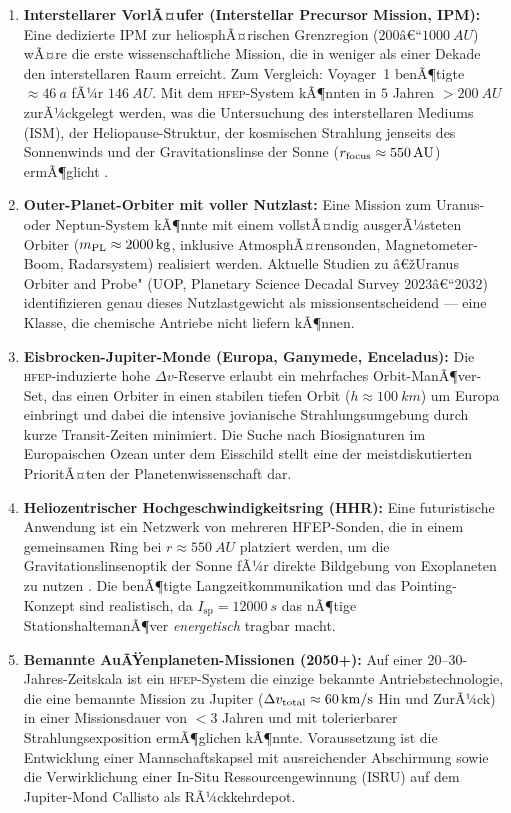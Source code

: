 ﻿\documentclass[a4paper,12pt,twoside]{article}
\theoremstyle{plain}
\theoremstyle{definition}
\theoremstyle{remark}
\newcommand{\Isp}{I_{\mathrm{sp}}}
\newcommand{\Dv}{\Delta v}
\newcommand{\HFEP}{\textsc{hfep}}
\begin{document}
	\begin{enumerate}
		\item \textbf{Interstellarer VorlÃ¤ufer (Interstellar Precursor Mission, IPM):}
		Eine dedizierte IPM zur heliosphÃ¤rischen Grenzregion
		($200\text{â€“}\SI{1000}{AU}$) wÃ¤re die erste wissenschaftliche Mission, die
		in weniger als einer Dekade den interstellaren Raum erreicht. Zum Vergleich:
		Voyager~1 benÃ¶tigte $\approx\SI{46}{a}$ fÃ¼r $\SI{146}{AU}$. Mit dem
		\HFEP-System kÃ¶nnten in $5$ Jahren $>\SI{200}{AU}$ zurÃ¼ckgelegt werden,
		was die Untersuchung des interstellaren Mediums (ISM), der
		Heliopause-Struktur, der kosmischen Strahlung jenseits des Sonnenwinds und
		der Gravitationslinse der Sonne ($r_{\rm focus} \approx \SI{550}{AU}$)
		ermÃ¶glicht \cite{stone2013}.

		\item \textbf{Outer-Planet-Orbiter mit voller Nutzlast:}
		Eine Mission zum Uranus- oder Neptun-System kÃ¶nnte mit einem vollstÃ¤ndig
		ausgerÃ¼steten Orbiter ($m_{\rm PL} \approx \SI{2000}{kg}$, inklusive
		AtmosphÃ¤rensonden, Magnetometer-Boom, Radarsystem) realisiert werden.
		Aktuelle Studien zu â€žUranus Orbiter and Probe" (UOP, Planetary Science
		Decadal Survey 2023â€“2032) identifizieren genau dieses Nutzlastgewicht als
		missionsentscheidend --- eine Klasse, die chemische Antriebe nicht liefern
		kÃ¶nnen.

		\item \textbf{Eisbrocken-Jupiter-Monde (Europa, Ganymede, Enceladus):}
		Die \HFEP-induzierte hohe $\Dv$-Reserve erlaubt ein mehrfaches
		Orbit-ManÃ¶ver-Set, das einen Orbiter in einen stabilen tiefen Orbit
		($h \approx \SI{100}{km}$) um Europa einbringt und dabei die intensive
		jovianische Strahlungsumgebung durch kurze Transit-Zeiten minimiert. Die
		Suche nach Biosignaturen im Europaischen Ozean unter dem Eisschild stellt
		eine der meistdiskutierten PrioritÃ¤ten der Planetenwissenschaft dar.

		\item \textbf{Heliozentrischer Hochgeschwindigkeitsring (HHR):}
		Eine futuristische Anwendung ist ein Netzwerk von mehreren HFEP-Sonden,
		die in einem gemeinsamen Ring bei $r \approx \SI{550}{AU}$ platziert werden,
		um die Gravitationslinsenoptik der Sonne fÃ¼r direkte Bildgebung
		von Exoplaneten zu nutzen \cite{kohlhase1977}. Die benÃ¶tigte
		Langzeitkommunikation und das Pointing-Konzept sind realistisch, da
		$\Isp = \SI{12000}{s}$ das nÃ¶tige StationshaltemanÃ¶ver \emph{energetisch}
		tragbar macht.

		\item \textbf{Bemannte AuÃŸenplaneten-Missionen (2050+):}
		Auf einer 20--30-Jahres-Zeitskala ist ein \HFEP-System die einzige
		bekannte Antriebstechnologie, die eine bemannte Mission zu Jupiter
		($\Dv_{\rm total}\approx\SI{60}{km/s}$ Hin und ZurÃ¼ck) in einer
		Missionsdauer von $<3$ Jahren und mit tolerierbarer Strahlungsexposition
		ermÃ¶glichen kÃ¶nnte. Voraussetzung ist die Entwicklung einer Mannschaftskapsel
		mit ausreichender Abschirmung sowie die Verwirklichung einer In-Situ
		Ressourcengewinnung (ISRU) auf dem Jupiter-Mond Callisto als RÃ¼ckkehrdepot.
	\end{enumerate}
\end{document}

